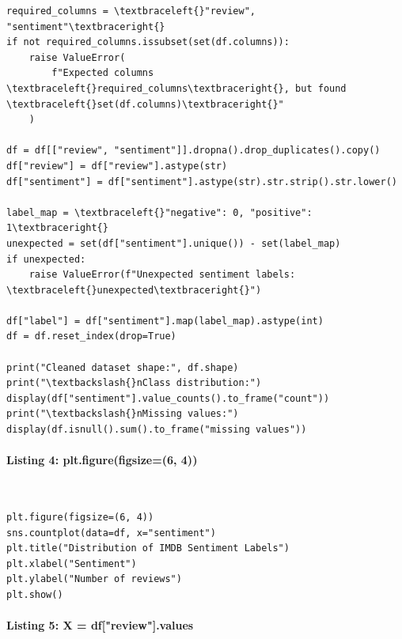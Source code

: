 \documentclass[12pt,a4paper,oneside]{report}
\begin{document}
\begin{Verbatim}[commandchars=\\\{\},breaklines=true,breakanywhere=true,fontsize=\scriptsize,frame=leftline,framesep=2mm,rulecolor=\color{gray}]
required_columns = \textbraceleft{}"review", "sentiment"\textbraceright{}
if not required_columns.issubset(set(df.columns)):
    raise ValueError(
        f"Expected columns \textbraceleft{}required_columns\textbraceright{}, but found \textbraceleft{}set(df.columns)\textbraceright{}"
    )

df = df[["review", "sentiment"]].dropna().drop_duplicates().copy()
df["review"] = df["review"].astype(str)
df["sentiment"] = df["sentiment"].astype(str).str.strip().str.lower()

label_map = \textbraceleft{}"negative": 0, "positive": 1\textbraceright{}
unexpected = set(df["sentiment"].unique()) - set(label_map)
if unexpected:
    raise ValueError(f"Unexpected sentiment labels: \textbraceleft{}unexpected\textbraceright{}")

df["label"] = df["sentiment"].map(label_map).astype(int)
df = df.reset_index(drop=True)

print("Cleaned dataset shape:", df.shape)
print("\textbackslash{}nClass distribution:")
display(df["sentiment"].value_counts().to_frame("count"))
print("\textbackslash{}nMissing values:")
display(df.isnull().sum().to_frame("missing values"))
\end{Verbatim}
\paragraph{Listing 4: plt.figure(figsize=(6, 4))}\mbox{}\\[-1ex]
\begin{Verbatim}[commandchars=\\\{\},breaklines=true,breakanywhere=true,fontsize=\scriptsize,frame=leftline,framesep=2mm,rulecolor=\color{gray}]
plt.figure(figsize=(6, 4))
sns.countplot(data=df, x="sentiment")
plt.title("Distribution of IMDB Sentiment Labels")
plt.xlabel("Sentiment")
plt.ylabel("Number of reviews")
plt.show()
\end{Verbatim}
\paragraph{Listing 5: X = df["review"].values}\mbox{}\\[-1ex]
\end{document}
